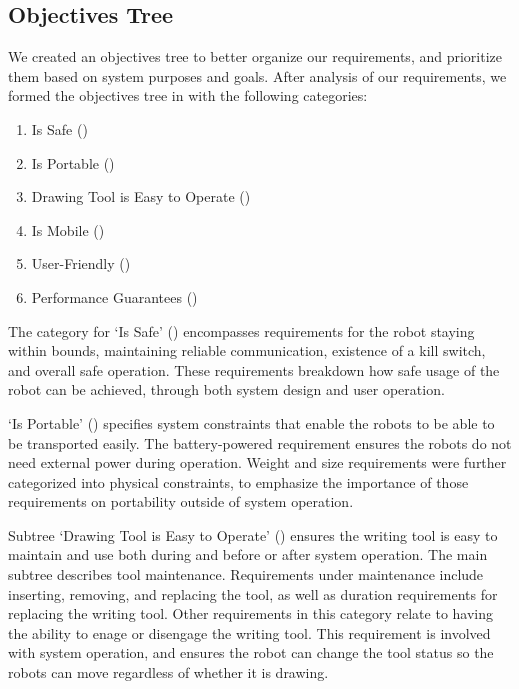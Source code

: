 \subsection{Objectives Tree}
\label{sec:objectives_tree}

We created an objectives tree to better organize our requirements, and prioritize them based on system purposes and goals. After analysis of our requirements, we
formed the objectives tree in  with the following categories:

\begin{enumerate}
\item Is Safe ()
\item Is Portable ()
\item Drawing Tool is Easy to Operate ()
\item Is Mobile ()
\item User-Friendly ()
\item Performance Guarantees ()
\end{enumerate}

The category for `Is Safe' () encompasses requirements for the robot staying within bounds, maintaining reliable communication, existence of a kill switch, and overall safe operation. These requirements breakdown how safe usage of the robot can be achieved, through both system design and user operation.

`Is Portable' () specifies system constraints that enable the robots to be able to be transported easily. The battery-powered requirement ensures the robots do not need external power during operation. Weight and size requirements were further categorized into physical constraints, to emphasize the importance of those requirements on portability outside of system operation.

Subtree `Drawing Tool is Easy to Operate' () ensures the writing tool is easy to maintain and use both during and before or after system operation. The main subtree describes tool maintenance. Requirements under maintenance include inserting, removing, and replacing the tool, as well as duration requirements for replacing the writing tool. Other requirements in this category relate to having the ability to enage or disengage the writing tool. This requirement is involved with system operation, and ensures the robot can change the tool status so the robots can move regardless of whether it is drawing.

